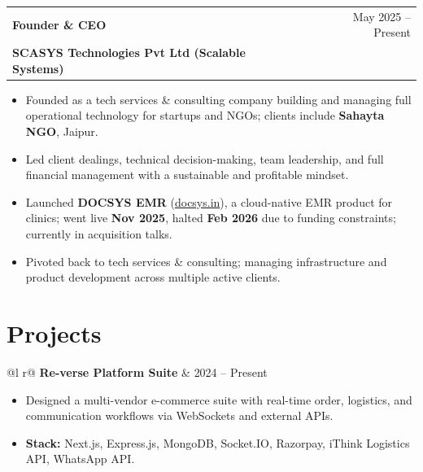 \documentclass[a4paper,10pt]{article}
\begin{document}
\begin{tabularx}{\linewidth}{ @{}l X r@{} }
\textbf{Founder \& CEO} & \hfill & \textcolor[HTML]{371e77}{May 2025 -- Present} \\
\textcolor[HTML]{371e77}{\textbf{SCASYS Technologies Pvt Ltd (Scalable Systems)}} & & \\
\end{tabularx}
\vspace{-8pt}
\begin{itemize}[nosep, leftmargin=1.5em, itemsep=0pt, topsep=0pt]
\item Founded as a tech services \& consulting company building and managing full operational technology for startups and NGOs; clients include \textbf{Sahayta NGO}, Jaipur.
\item Led client dealings, technical decision-making, team leadership, and full financial management with a sustainable and profitable mindset.
\item Launched \textbf{DOCSYS EMR} (\href{https://docsys.in}{docsys.in}), a cloud-native EMR product for clinics; went live \textbf{Nov 2025}, halted \textbf{Feb 2026} due to funding constraints; currently in acquisition talks.
\item Pivoted back to tech services \& consulting; managing infrastructure and product development across multiple active clients.
\end{itemize}

\section{Projects}

\begin{tabularx}{\linewidth}{ @{}l r@{} }
\textbf{Re-verse Platform Suite} & \textcolor[HTML]{371e77}{2024 -- Present} \\
\end{tabularx}
\vspace{-8pt}
\begin{itemize}[nosep, leftmargin=1.5em, itemsep=0pt, topsep=0pt]
\item Designed a multi-vendor e-commerce suite with real-time order, logistics, and communication workflows via WebSockets and external APIs.
\item \textbf{Stack:} Next.js, Express.js, MongoDB, Socket.IO, Razorpay, iThink Logistics API, WhatsApp API.
\end{itemize}
\end{document}
